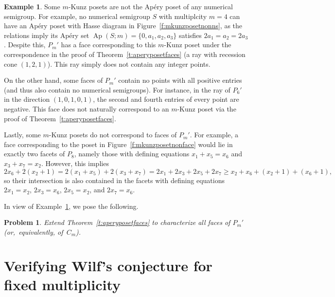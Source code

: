 \documentclass[12pt]{amsart}
\newtheorem{prob}[thm]{Problem}
\theoremstyle{definition}
\newtheorem{example}[thm]{Example}
\numberwithin{equation}{section}
\renewcommand\>{\rangle}
\newcommand\<{\langle}
\newcommand\0{\mathbf{0}}
\DeclareMathOperator\Ap{Ap} %
\begin{document}
\begin{example}\label{e:nofacebijection}
Some $m$-Kunz posets are not the Ap\'ery poset of any numerical semigroup.  For example, no numerical semigroup $S$ with multiplcity $m = 4$ can have an Ap\'ery poset with Hasse diagram in Figure~\ref{f:mkunzposetnonns}, as the relations imply its Ap\'ery set $\Ap(S;m) = \{0, a_1, a_2, a_3\}$ satisfies $2a_1 = a_2 = 2a_3$.  Despite this, $P_m'$ has a face corresponding to this $m$-Kunz poset under the correspondence in the proof of Theorem~\ref{t:aperyposetfaces} (a ray with recession cone $(1, 2, 1)$).  This ray simply does not contain any integer points.  

On the other hand, some faces of $P_m'$ contain no points with all positive entries (and thus also contain no numerical semigroups).  For instance, in the ray of $P_6'$ in the direction $(1, 0, 1, 0, 1)$, the second and fourth entries of every point are negative.  This face does not naturally correspond to an $m$-Kunz poset via the proof of Theorem~\ref{t:aperyposetfaces}.  

Lastly, some $m$-Kunz posets do not correspond to faces of $P_m'$.  For example, a face corresponding to the poset in Figure~\ref{f:mkunzposetnonface} would lie in exactly two facets of $P_8$, namely those with defining equations $x_1 + x_5 = x_6$ and $x_3 + x_7 = x_2$.  However, this implies 
\[
2x_6 + 2(x_2 + 1) = 2(x_1 + x_5) + 2(x_3 + x_7) = 2x_1 + 2x_3 + 2x_5 + 2x_7 \ge x_2 + x_6 + (x_2 + 1) + (x_6 + 1),
\]
so their intersection is also contained in the facets with defining equations $2x_1 = x_2$, $2x_3 = x_6$, $2x_5 = x_2$, and $2x_7 = x_6$.  
\end{example}

In view of Example~\ref{e:nofacebijection}, we pose the following.  

\begin{prob}\label{prob:facebijection}
Extend Theorem~\ref{t:aperyposetfaces} to characterize all faces of $P_m'$ (or,~equivalently, of~$C_m$).  
\end{prob}



\section{Verifying Wilf's conjecture for fixed multiplicity}%
\label{sec:algorithm}%
\end{document}
